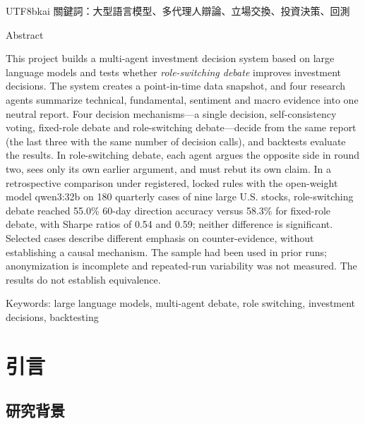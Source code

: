 \documentclass[12pt,a4paper]{article}
\begin{document}
\begin{CJK}{UTF8}{bkai}
\vspace{0.6cm}
\noindent 關鍵詞：大型語言模型、多代理人辯論、立場交換、投資決策、回測

\clearpage
\begin{center}
{\fontsize{16}{24}\selectfont Abstract\par}
\end{center}
\vspace{0.3cm}

\noindent This project builds a multi-agent investment decision system based on large language models and tests whether \emph{role-switching debate} improves investment decisions. The system creates a point-in-time data snapshot, and four research agents summarize technical, fundamental, sentiment and macro evidence into one neutral report. Four decision mechanisms---a single decision, self-consistency voting, fixed-role debate and role-switching debate---decide from the same report (the last three with the same number of decision calls), and backtests evaluate the results. In role-switching debate, each agent argues the opposite side in round two, sees only its own earlier argument, and must rebut its own claim. In a retrospective comparison under registered, locked rules with the open-weight model qwen3:32b on 180 quarterly cases of nine large U.S. stocks, role-switching debate reached 55.0\% 60-day direction accuracy versus 58.3\% for fixed-role debate, with Sharpe ratios of 0.54 and 0.59; neither difference is significant. Selected cases describe different emphasis on counter-evidence, without establishing a causal mechanism. The sample had been used in prior runs; anonymization is incomplete and repeated-run variability was not measured. The results do not establish equivalence.

\vspace{0.6cm}
\noindent Keywords: large language models, multi-agent debate, role switching, investment decisions, backtesting

\clearpage
{}

\section{引言}

\subsection{研究背景}


\end{CJK}
\end{document}
